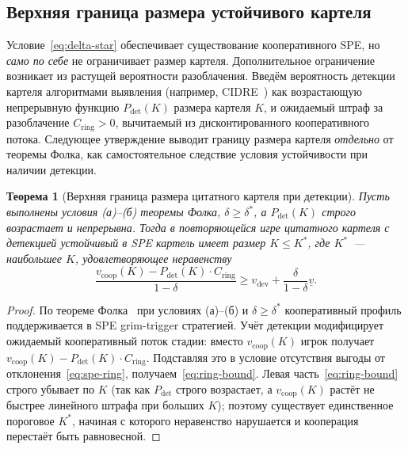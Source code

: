 \documentclass[12pt,a4paper]{article}
\newtheorem{theorem}{Теорема}
\theoremstyle{definition}
\begin{document}
\subsection{Верхняя граница размера устойчивого картеля}

Условие~\eqref{eq:delta-star} обеспечивает существование
кооперативного SPE, но \emph{само по себе} не ограничивает размер
картеля. Дополнительное ограничение возникает из растущей вероятности
разоблачения. Введём вероятность детекции картеля алгоритмами
выявления (например, CIDRE~\citep{kojaku2021}) как возрастающую
непрерывную функцию $P_{\mathrm{det}}(K)$ размера картеля $K$, и
ожидаемый штраф за разоблачение $C_{\mathrm{ring}} > 0$, вычитаемый
из дисконтированного кооперативного потока. Следующее утверждение
выводит границу размера картеля \emph{отдельно} от теоремы Фолка, как
самостоятельное следствие условия устойчивости при наличии детекции.

\begin{theorem}[Верхняя граница размера цитатного картеля при детекции]
  \label{thm:folk}
  Пусть выполнены условия \textup{(а)--(б)} теоремы Фолка, $\delta
  \geq \delta^*$, а $P_{\mathrm{det}}(K)$ строго возрастает и
  непрерывна. Тогда в повторяющейся игре цитатного картеля с
  детекцией устойчивый в SPE картель имеет размер $K \leq K^{*}$, где
  $K^{*}$~--- наибольшее $K$, удовлетворяющее неравенству
  \begin{equation}
    \frac{v_{\mathrm{coop}}(K) - P_{\mathrm{det}}(K) \cdot
    C_{\mathrm{ring}}}{1 - \delta} \geq v_{\mathrm{dev}} +
    \frac{\delta}{1 - \delta} \underline{v}.
    \label{eq:ring-bound}
  \end{equation}
\end{theorem}

\begin{proof}
  По теореме Фолка~\citep{fudenberg1986} при условиях (а)--(б) и
  $\delta \geq \delta^*$ кооперативный профиль поддерживается в SPE
  grim-trigger стратегией. Учёт детекции модифицирует ожидаемый
  кооперативный поток стадии: вместо $v_{\mathrm{coop}}(K)$ игрок
  получает $v_{\mathrm{coop}}(K) - P_{\mathrm{det}}(K) \cdot
  C_{\mathrm{ring}}$. Подставляя это в условие отсутствия выгоды от
  отклонения~\eqref{eq:spe-ring}, получаем~\eqref{eq:ring-bound}.
  Левая часть~\eqref{eq:ring-bound} строго убывает по $K$ (так как
    $P_{\mathrm{det}}$ строго возрастает, а $v_{\mathrm{coop}}(K)$
  растёт не быстрее линейного штрафа при больших $K$); поэтому
  существует единственное пороговое $K^*$, начиная с которого
  неравенство нарушается и кооперация перестаёт быть равновесной.
\end{proof}
\end{document}

